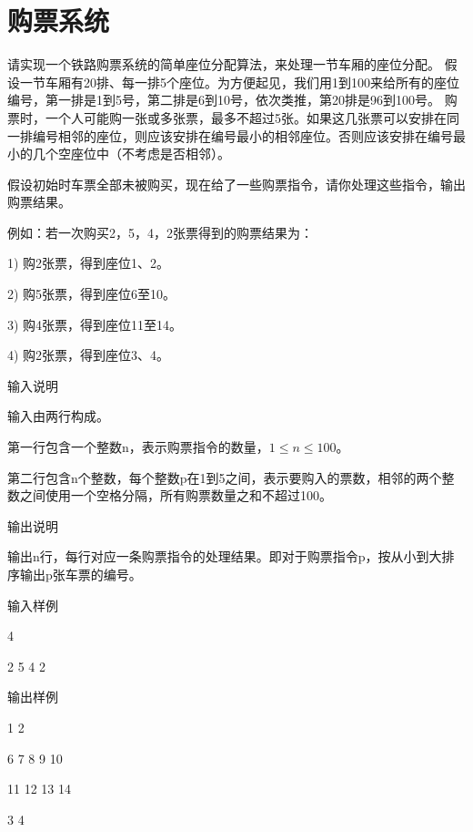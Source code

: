 \section{购票系统}
请实现一个铁路购票系统的简单座位分配算法，来处理一节车厢的座位分配。 
假设一节车厢有20排、每一排5个座位。为方便起见，我们用1到100来给所有的座位编号，第一排是1到5号，第二排是6到10号，依次类推，第20排是96到100号。 
购票时，一个人可能购一张或多张票，最多不超过5张。如果这几张票可以安排在同一排编号相邻的座位，则应该安排在编号最小的相邻座位。否则应该安排在编号最小的几个空座位中（不考虑是否相邻）。 

假设初始时车票全部未被购买，现在给了一些购票指令，请你处理这些指令，输出购票结果。 

例如：若一次购买2，5，4，2张票得到的购票结果为： 

1) 购2张票，得到座位1、2。 

2) 购5张票，得到座位6至10。 

3) 购4张票，得到座位11至14。 

4) 购2张票，得到座位3、4。 

输入说明

输入由两行构成。 

第一行包含一个整数n，表示购票指令的数量，$1\le n\le 100$。 

第二行包含n个整数，每个整数p在1到5之间，表示要购入的票数，相邻的两个整数之间使用一个空格分隔，所有购票数量之和不超过100。 

输出说明

输出n行，每行对应一条购票指令的处理结果。即对于购票指令p，按从小到大排序输出p张车票的编号。 

输入样例

4 

2 5 4 2 

输出样例

1 2 

6 7 8 9 10 

11 12 13 14 

3 4 


